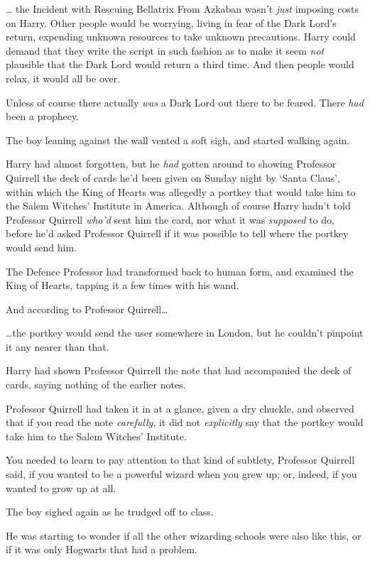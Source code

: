 \ldots{} the Incident with Rescuing Bellatrix From Azkaban wasn't
\emph{just} imposing costs on Harry. Other people would be worrying,
living in fear of the Dark Lord's return, expending unknown resources to
take unknown precautions. Harry could demand that they write the script
in such fashion as to make it seem \emph{not} plausible that the Dark
Lord would return a third time. And then people would relax, it would
all be over.

Unless of course there actually \emph{was} a Dark Lord out there to be
feared. There \emph{had} been a prophecy.

The boy leaning against the wall vented a soft sigh, and started walking
again.

Harry had almost forgotten, but he \emph{had} gotten around to showing
Professor Quirrell the deck of cards he'd been given on Sunday night by
`Santa Claus', within which the King of Hearts was allegedly a portkey
that would take him to the Salem Witches' Institute in America. Although
of course Harry hadn't told Professor Quirrell \emph{who'd} sent him the
card, nor what it was \emph{supposed} to do, before he'd asked Professor
Quirrell if it was possible to tell where the portkey would send him.

The Defence Professor had transformed back to human form, and examined
the King of Hearts, tapping it a few times with his wand.

And according to Professor Quirrell\ldots{}

\ldots{}the portkey would send the user somewhere in London, but he
couldn't pinpoint it any nearer than that.

Harry had shown Professor Quirrell the note that had accompanied the
deck of cards, saying nothing of the earlier notes.

Professor Quirrell had taken it in at a glance, given a dry chuckle, and
observed that if you read the note \emph{carefully}, it did not
\emph{explicitly} say that the portkey would take him to the Salem
Witches' Institute.

You needed to learn to pay attention to that kind of subtlety, Professor
Quirrell said, if you wanted to be a powerful wizard when you grew up;
or, indeed, if you wanted to grow up at all.

The boy sighed again as he trudged off to class.

He was starting to wonder if all the other wizarding schools were also
like this, or if it was only Hogwarts that had a problem.
